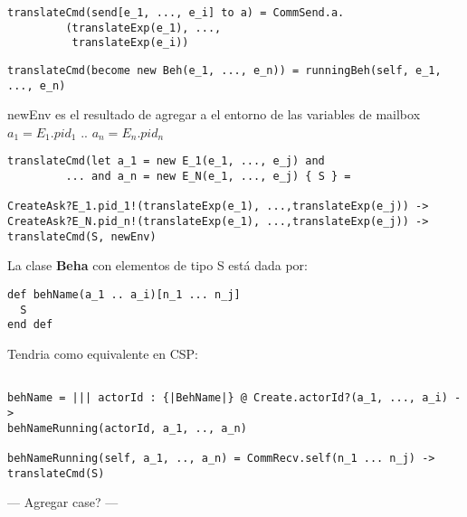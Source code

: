 \documentclass[fleqn]{article}
\begin{document}
\begin{verbatim}
translateCmd(send[e_1, ..., e_i] to a) = CommSend.a.
         (translateExp(e_1), ..., 
          translateExp(e_i)) 
\end{verbatim}

\begin{verbatim}
translateCmd(become new Beh(e_1, ..., e_n)) = runningBeh(self, e_1, ..., e_n)
\end{verbatim}

newEnv es el resultado de agregar a el entorno de las variables de mailbox $a_1
= E_1.pid_1$ .. $a_n = E_n.pid_n$
\begin{verbatim}
translateCmd(let a_1 = new E_1(e_1, ..., e_j) and 
         ... and a_n = new E_N(e_1, ..., e_j) { S } = 

CreateAsk?E_1.pid_1!(translateExp(e_1), ...,translateExp(e_j)) ->
CreateAsk?E_N.pid_n!(translateExp(e_1), ...,translateExp(e_j)) ->
translateCmd(S, newEnv)
\end{verbatim}


La clase \textbf{Beha} con elementos de tipo S está dada por:

\begin{verbatim}
def behName(a_1 .. a_i)[n_1 ... n_j]
  S
end def
\end{verbatim}

Tendria como equivalente en CSP:

\begin{verbatim}

behName = ||| actorId : {|BehName|} @ Create.actorId?(a_1, ..., a_i) ->
behNameRunning(actorId, a_1, .., a_n)

behNameRunning(self, a_1, .., a_n) = CommRecv.self(n_1 ... n_j) -> translateCmd(S)

\end{verbatim}

--- Agregar case? ---

{}

\end{document}
